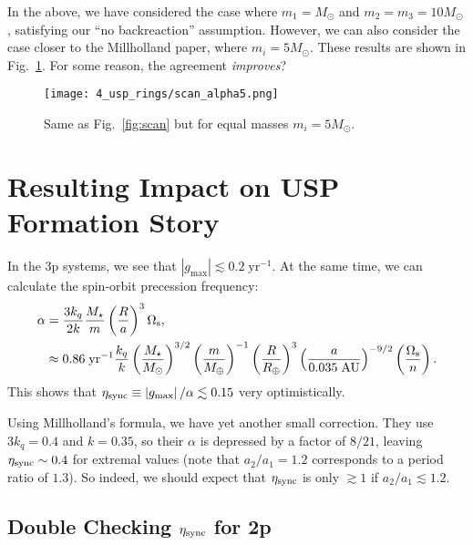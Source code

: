 \documentclass[11pt,
        usenames, %
        dvipsnames %
    ]{article}
\newcommand*{\abs}[1]{\left|#1\right|}
\newcommand*{\p}[1]{\left(#1\right)}
\begin{document}
In the above, we have considered the case where $m_1 = M_{\odot}$ and $m_2 = m_3
= 10M_{\odot}$, satisfying our ``no backreaction'' assumption. However, we can
also consider the case closer to the Millholland paper, where $m_i =
5M_{\odot}$. These results are shown in Fig.~\ref{fig:scan5}. For some reason,
the agreement \emph{improves}?
\begin{figure}
    \centering
    \texttt{[image: 4\_usp\_rings/scan\_alpha5.png]}
    \caption{Same as Fig.~\ref{fig:scan} but for equal masses $m_i =
    5M_{\odot}$.}\label{fig:scan5}
\end{figure}

\section{Resulting Impact on USP Formation Story}

In the 3p systems, we see that $\abs{g_{\max}} \lesssim 0.2 \;\mathrm{yr^{-1}}$.
At the same time, we can calculate the spin-orbit precession frequency:
\begin{align}
    \alpha &= \frac{3k_q}{2k}\frac{M_\star}{m}
        \p{\frac{R}{a}}^3 \Omega_{\rm s},\\
        &\approx 0.86\;\mathrm{yr^{-1}}
            \frac{k_q}{k}
            \p{\frac{M_{\star}}{M_{\odot}}}^{3/2}
            \p{\frac{m}{M_{\oplus}}}^{-1}
            \p{\frac{R}{R_{\oplus}}}^3
            \p{\frac{a}{0.035\;\mathrm{AU}}}^{-9/2}
            \p{\frac{\Omega_{\rm s}}{n}}.
\end{align}
This shows that $\eta_{\rm sync} \equiv \abs{g_{\max}} / \alpha \lesssim 0.15$
very optimistically.

Using Millholland's formula, we have yet another small correction. They use
$3k_q = 0.4$ and $k = 0.35$, so their $\alpha$ is depressed by a factor of
$8/21$, leaving $\eta_{\rm sync} \sim 0.4$ for extremal values (note that $a_2 /
a_1 = 1.2$ corresponds to a period ratio of $1.3$). So indeed, we should expect
that $\eta_{\rm sync}$ is only $\gtrsim 1$ if $a_2 / a_1 \lesssim 1.2$.

\subsection{Double Checking $\eta_{\rm sync}$ for 2p}
\end{document}
